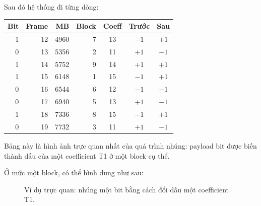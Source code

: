 \documentclass[11pt,a4paper]{article}
\begin{document}
Sau đó hệ thống đi từng dòng:

\begin{center}
\begin{tabular}{rrrrccc}
\toprule
Bit & Frame & MB & Block & Coeff & Trước & Sau \\
\midrule
1 & 12 & 4960 & 7 & 13 & \(-1\) & \(+1\) \\
0 & 13 & 5356 & 2 & 11 & \(+1\) & \(-1\) \\
1 & 14 & 5752 & 9 & 14 & \(+1\) & \(+1\) \\
1 & 15 & 6148 & 1 & 15 & \(-1\) & \(+1\) \\
0 & 16 & 6544 & 6 & 12 & \(-1\) & \(-1\) \\
0 & 17 & 6940 & 5 & 13 & \(+1\) & \(-1\) \\
1 & 18 & 7336 & 8 & 15 & \(-1\) & \(+1\) \\
0 & 19 & 7732 & 3 & 11 & \(+1\) & \(-1\) \\
\bottomrule
\end{tabular}
\end{center}

Bảng này là hình ảnh trực quan nhất của quá trình nhúng: payload bit được biến
thành dấu của một coefficient T1 ở một block cụ thể.

Ở mức một block, có thể hình dung như sau:

\begin{figure}[H]
\centering
{}
\caption{Ví dụ trực quan: nhúng một bit bằng cách đổi dấu một coefficient T1.}
\label{fig:block-example}
\end{figure}
\end{document}
